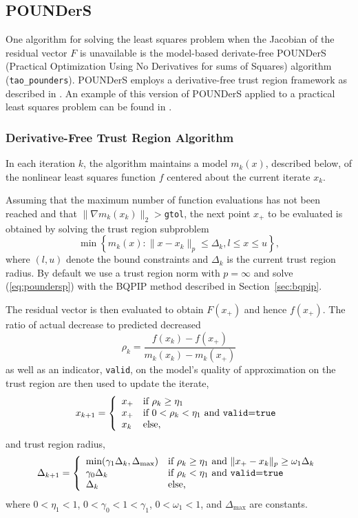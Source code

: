 \subsection{POUNDerS}
   One algorithm for solving the least squares problem when the Jacobian
of the residual vector $F$ is unavailable is the model-based
derivate-free POUNDerS (Practical Optimization Using No Derivatives for
sums of Squares) algorithm (\texttt{tao\_pounders}). 
POUNDerS employs a derivative-free trust region framework as described in
\cite{Dfobook}. An example of this version of POUNDerS applied to a
practical least squares problem can be found in \cite{UNEDF0}.



\subsubsection{Derivative-Free Trust Region Algorithm}
In each iteration $k$, the algorithm maintains a model $m_k(x)$,
described below, of the nonlinear least squares function $f$ centered about
the current iterate $x_k$. 

Assuming that the maximum number of function evaluations has not been
reached and that $\|\nabla m_k(x_k)\|_2>$\texttt{gtol}, the next point 
$x_+$ to be evaluated is obtained by solving the trust region subproblem 
\begin{equation}
 \min\left\{
 m_k(x) : 
 \|x-x_k\|_{p} \leq \Delta_k, 
 l\leq x \leq u\right
 \}, 
 \label{eq:poundersp}
\end{equation}
where $(l,u)$ denote the bound constraints and $\Delta_k$ is the current
trust region radius. By default we use a trust region norm with $p=\infty$
and solve (\ref{eq:poundersp}) with the BQPIP method described in
Section~\ref{sec:bqpip}. 

The residual vector is then evaluated to obtain $F(x_+)$ and hence
$f(x_+)$. The ratio of actual decrease to predicted decreased
\[
 \rho_k = \frac{f(x_k)-f(x_+)}{m_k(x_k)-m_k(x_+)}
\]
as well as an indicator, \texttt{valid}, on the model's quality of
approximation on the trust region are then used to update the iterate,
\[
x_{k+1} = \left\{\begin{array}{ll}
x_+ & \mbox{if } \rho_k \geq \eta_1 \\
x_+ & \mbox{if } 0<\rho_k <\eta_1  \mbox{ and \texttt{valid}=\texttt{true}}
\\
x_k & \mbox{else}, 
\end{array}
\right.
\]
and trust region radius,
\[
\Delta_{k+1} = \left\{\begin{array}{ll}
 \mbox{min}(\gamma_1\Delta_k, \Delta_{\max}) & \mbox{if } \rho_k \geq
\eta_1 \mbox{ and } \|x_+-x_k\|_p\geq \omega_1\Delta_k \\
\gamma_0\Delta_k & \mbox{if } \rho_k < \eta_1 \mbox{ and
\texttt{valid}=\texttt{true}} \\
\Delta_k &  \mbox{else,}
\end{array}
\right.
\]
where $0 < \eta_1 < 1$,  $0 < \gamma_0 < 1 < \gamma_1$, $0<\omega_1<1$,
and $\Delta_{\max}$ are constants. 

